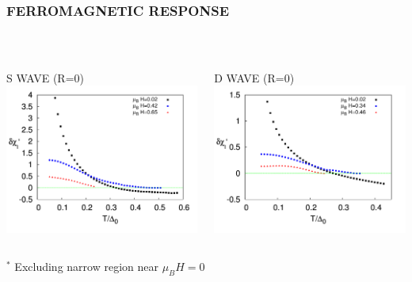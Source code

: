 \documentclass[amssymb,amsmath]{beamer}
\begin{document}
\begin{frame} \frametitle{FERROMAGNETIC RESPONSE}
 \\
\vspace{1cm}
\begin{columns}
\begin{column}{0.5\textwidth}
\centering S WAVE (R=0)
\includegraphics[scale=0.17]{./figures_3/fig_5/Fig5S_1.png} \\
\end{column}
\begin{column}{0.5\textwidth}
\centering D WAVE (R=0)
\includegraphics[scale=0.17]{./figures_3/fig_5/Fig5D_1.png} \\
\end{column}
\end{columns}
${}^*$ Excluding narrow region near $\mu_B H =0$ 
\end{frame}
\end{document}
